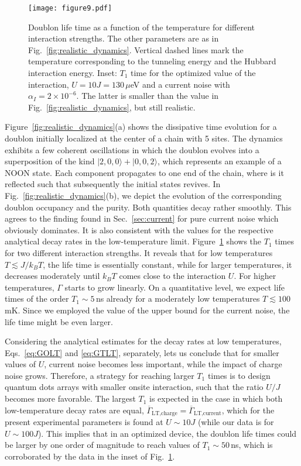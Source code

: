 \documentclass[twocolumn,prb,showpacs]{revtex4-1}
\begin{document}
\begin{figure}
    \centering\texttt{[image: figure9.pdf]}
    \caption{Doublon life time as a function of the temperature for
	different interaction strengths.  The other parameters are as in
	Fig.~\ref{fig:realistic_dynamics}. Vertical dashed lines mark the 
    temperature corresponding to the tunneling energy and the Hubbard 
    interaction energy.  
    Inset: $T_1$ time for the optimized value of the interaction,
	$U =10J =130\,\mu$eV and a current noise with
	$\alpha_I = 2\times10^{-6}$.  The latter is smaller than the value in
	Fig.~\ref{fig:realistic_dynamics}, but still realistic.
	}
    \label{fig:realistic_experiment}
\end{figure}

Figure~\ref{fig:realistic_dynamics}(a) shows the dissipative time evolution
for a doublon initially localized at the center of a chain with 5 sites.
The dynamics exhibits a few coherent oscillations in which the doublon
evolves into a superposition of the kind $|2,0,0\rangle + |0,0,2\rangle$,
which represents an example of a NOON state.\cite{Lee2002a}
Each component propagates to one end of the chain, where is it reflected
such that subsequently the initial states revives.  In
Fig.~\ref{fig:realistic_dynamics}(b), we depict the evolution of the
corresponding doublon occupancy and the purity.  Both quantities decay
rather smoothly.  This agrees to the finding found in
Sec.~\ref{sec:current} for pure current noise which obviously dominates.
It is also consistent with the values for the respective analytical decay
rates in the low-temperature limit.  Figure~\ref{fig:realistic_experiment}
shows the $T_1$ times for two different interaction strengths.  It reveals
that for low temperatures $T\lesssim J/k_BT$, the life time is essentially
constant, while for larger temperatures, it decreases moderately until
$k_BT$ comes close to the interaction $U$.  For higher temperatures,
$\Gamma$ starts to grow linearly.  On a quantitative level, we expect life
times of the order $T_1\sim 5$\,ns already for a moderately low
temperatures $T\lesssim 100$\,mK.  Since we employed the value of the upper
bound for the current noise, the life time might be even larger.

Considering the analytical estimates for the decay rates at low
temperatures, Eqs.~\eqref{eq:GOLT} and \eqref{eq:GTLT}, separately,
lets us conclude that for smaller values of $U$, current noise becomes
less important, while the impact of charge noise grows.  Therefore, a
strategy for reaching larger $T_1$ times is to
design quantum dots arrays with smaller onsite interaction, such
that the ratio $U/J$ becomes more favorable.  The largest $T_1$ is expected
in the case in which both low-temperature decay rates are equal,
$\overline{\Gamma}_\text{LT,charge} = \overline{\Gamma}_\text{LT,current}$, 
which for the present experimental parameters is found at $U\sim 10J$ (while 
our data is for $U\sim 100 J$).  This implies that in an optimized device, 
the doublon life times could be larger by one order of magnitude to reach 
values of $T_1\sim 50$\,ns, which is corroborated by the data in the inset 
of Fig.~\ref{fig:realistic_experiment}.
\end{document}
